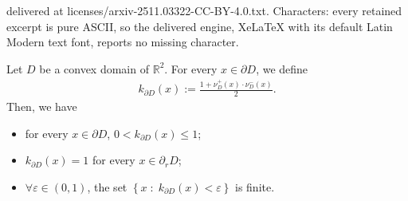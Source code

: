 \documentclass[10pt,a4paper]{amsart}
\def\e{\varepsilon}
\def\sepa{\; : \;}
\newcommand{\RR}{\mathbb{R}}
\newcommand{\aco}[1]{\left\{#1\right\}}
\begin{document}
delivered at licenses/arxiv-2511.03322-CC-BY-4.0.txt. Characters: every retained excerpt is pure ASCII, so the delivered engine, XeLaTeX with its default Latin Modern text font, reports no missing character.
\begin{lemma}\label{access}
Let $D$ be a convex  domain  of $\RR^2$. For every $x\in \partial D$, we define
\begin{align*}
k_{\partial D}(x):= \frac{1+ \nu_D^+(x)\cdot\nu_D^-(x)}{2}.
\end{align*}
Then, we have
\begin{itemize}
\item[(i)] for every $x\in\partial D$, $0<k_{\partial D}(x) \le 1$;
\item[(ii)] $k_{\partial D}(x) = 1$ for every $x\in \partial_r D$;
\item[(iii)] $\forall\e \in(0,1)$, the set  $\aco{x \sepa k_{\partial D}(x) <\e }$ is finite.
\end{itemize}
\end{lemma}
\end{document}
